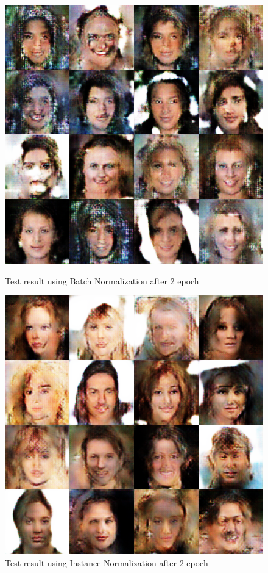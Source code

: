 \begin{figure}
    \begin{minipage}[t]{0.48\linewidth}
        \centering
        \includegraphics[width=\textwidth]{figures/result_norm_batch.png}
        \caption{Test result using Batch Normalization after 2 epoch}
        \label{norm_bach}
    \end{minipage}
        \hfill
    \begin{minipage}[t]{0.48\linewidth}
        \centering
        \includegraphics[width=\textwidth]{figures/result_norm_instance.png}
        \caption{Test result using Instance Normalization after 2 epoch}
        \label{norm_instance}
    \end{minipage}
\end{figure}

